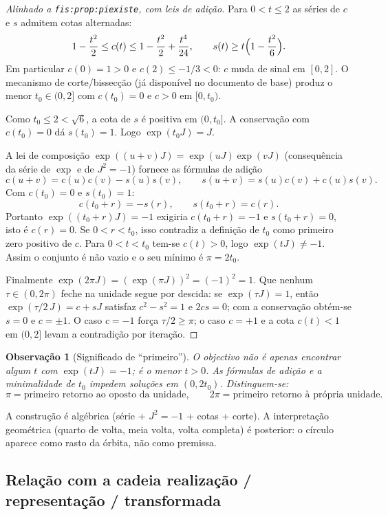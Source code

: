 \documentclass[11pt,a4paper]{article}
\newtheorem{observacao}{Observação}
\begin{document}
\begin{proof}[Alinhado a \texttt{fis:prop:piexiste}, com leis de adição]
Para \(0<t\le 2\) as séries de \(c\) e \(s\) admitem cotas alternadas:
\[
1-\frac{t^2}{2}\le c(t)\le 1-\frac{t^2}{2}+\frac{t^4}{24},\qquad
s(t)\ge t\Bigl(1-\frac{t^2}{6}\Bigr).
\]
Em particular \(c(0)=1>0\) e \(c(2)\le -1/3<0\): \(c\) muda de sinal em \([0,2]\). O mecanismo de corte/bissecção (já disponível no documento de base) produz o menor \(t_0\in(0,2]\) com \(c(t_0)=0\) e \(c>0\) em \([0,t_0)\).

Como \(t_0\le 2<\sqrt 6\), a cota de \(s\) é positiva em \((0,t_0]\). A conservação com \(c(t_0)=0\) dá \(s(t_0)=1\). Logo \(\exp(t_0 J)=J\).

A lei de composição \(\exp((u+v)J)=\exp(uJ)\exp(vJ)\) (consequência da série de \(\exp\) e de \(J^2=-1\)) fornece as fórmulas de adição
\[
c(u+v)=c(u)c(v)-s(u)s(v),\qquad
s(u+v)=s(u)c(v)+c(u)s(v).
\]
Com \(c(t_0)=0\) e \(s(t_0)=1\):
\[
c(t_0+r)=-s(r),\qquad
s(t_0+r)=c(r).
\]
Portanto \(\exp((t_0+r)J)=-1\) exigiria \(c(t_0+r)=-1\) e \(s(t_0+r)=0\), isto é \(c(r)=0\). Se \(0<r<t_0\), isso contradiz a definição de \(t_0\) como primeiro zero positivo de \(c\). Para \(0<t<t_0\) tem-se \(c(t)>0\), logo \(\exp(tJ)\neq -1\). Assim o conjunto é não vazio e o seu mínimo é \(\pi=2t_0\).

Finalmente \(\exp(2\pi J)=(\exp(\pi J))^2=(-1)^2=1\). Que nenhum \(\tau\in(0,2\pi)\) feche na unidade segue por descida: se \(\exp(\tau J)=1\), então \(\exp(\tau/2\,J)=c+sJ\) satisfaz \(c^2-s^2=1\) e \(2cs=0\); com a conservação obtém-se \(s=0\) e \(c=\pm 1\). O caso \(c=-1\) força \(\tau/2\ge\pi\); o caso \(c=+1\) e a cota \(c(t)<1\) em \((0,2]\) levam a contradição por iteração.
\end{proof}

\begin{observacao}[Significado de ``primeiro'']
O objectivo não é apenas encontrar algum \(t\) com \(\exp(tJ)=-1\); é o \emph{menor} \(t>0\). As fórmulas de adição e a minimalidade de \(t_0\) impedem soluções em \((0,2t_0)\). Distinguem-se:
\[
\pi=\text{primeiro retorno ao oposto da unidade},
\qquad
2\pi=\text{primeiro retorno à própria unidade}.
\]
\end{observacao}

A construção é algébrica (série + \(J^2=-1\) + cotas + corte). A interpretação geométrica (quarto de volta, meia volta, volta completa) é posterior: o círculo aparece como rasto da órbita, não como premissa.

\subsection{Relação com a cadeia realização / representação / transformada}
\end{document}
